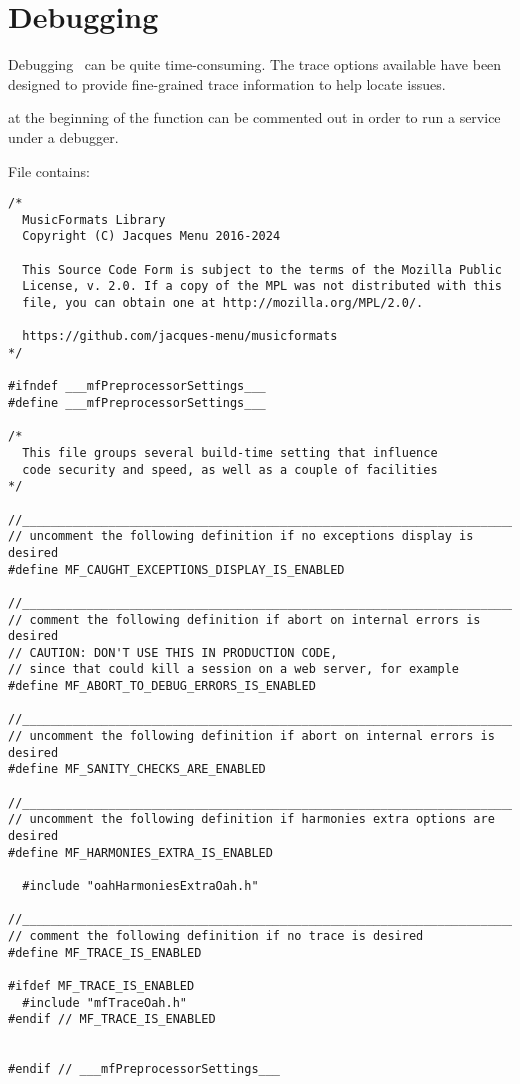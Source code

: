 

\chapter{Debugging}

Debugging \mf\ can be quite time-consuming. The trace options available have been designed to provide fine-grained trace information to help locate issues.

 at the beginning of the  function can be commented out in order to run a service under a debugger.

File  contains:
\begin{lstlisting}[language=CPlusPlus]
/*
  MusicFormats Library
  Copyright (C) Jacques Menu 2016-2024

  This Source Code Form is subject to the terms of the Mozilla Public
  License, v. 2.0. If a copy of the MPL was not distributed with this
  file, you can obtain one at http://mozilla.org/MPL/2.0/.

  https://github.com/jacques-menu/musicformats
*/

#ifndef ___mfPreprocessorSettings___
#define ___mfPreprocessorSettings___

/*
  This file groups several build-time setting that influence
  code security and speed, as well as a couple of facilities
*/

//______________________________________________________________________________
// uncomment the following definition if no exceptions display is desired
#define MF_CAUGHT_EXCEPTIONS_DISPLAY_IS_ENABLED

//______________________________________________________________________________
// comment the following definition if abort on internal errors is desired
// CAUTION: DON'T USE THIS IN PRODUCTION CODE,
// since that could kill a session on a web server, for example
#define MF_ABORT_TO_DEBUG_ERRORS_IS_ENABLED

//______________________________________________________________________________
// uncomment the following definition if abort on internal errors is desired
#define MF_SANITY_CHECKS_ARE_ENABLED

//______________________________________________________________________________
// uncomment the following definition if harmonies extra options are desired
#define MF_HARMONIES_EXTRA_IS_ENABLED

  #include "oahHarmoniesExtraOah.h"

//______________________________________________________________________________
// comment the following definition if no trace is desired
#define MF_TRACE_IS_ENABLED

#ifdef MF_TRACE_IS_ENABLED
  #include "mfTraceOah.h"
#endif // MF_TRACE_IS_ENABLED


#endif // ___mfPreprocessorSettings___
\end{lstlisting}


